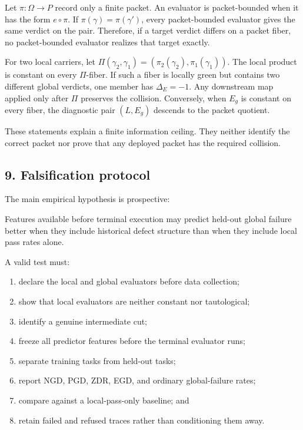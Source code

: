 \documentclass[
  11pt,
]{article}
\providecommand{\tightlist}{%
  \setlength{\itemsep}{0pt}\setlength{\parskip}{0pt}}
\theoremstyle{plain}
\theoremstyle{definition}\newtheorem{definition}[theorem]{Definition}
\theoremstyle{remark}\newtheorem*{remark}{Remark}
\renewenvironment{quote}{%
  \begin{mdframed}[linewidth=0pt,leftline=true,linecolor=obrule,
    rightline=false,topline=false,bottomline=false,
    innerleftmargin=1em,innerrightmargin=0.8em,innertopmargin=0.5em,
    innerbottommargin=0.5em,skipabove=0.6em,skipbelow=0.6em,
    backgroundcolor=obboxbg]\small}{\end{mdframed}}
\begin{document}
Let \(\pi:\Omega\to P\) record only a finite packet. An evaluator is
packet-bounded when it has the form \(e\circ\pi\). If
\(\pi(\gamma)=\pi(\gamma')\), every packet-bounded evaluator gives the same
verdict on the pair. Therefore, if a target verdict differs on a packet
fiber, no packet-bounded evaluator realizes that target exactly.

For two local carriers, let
\(\Pi(\gamma_2,\gamma_1)=(\pi_2(\gamma_2),\pi_1(\gamma_1))\).
The local product is constant on every \(\Pi\)-fiber. If such a fiber is
locally green but contains two different global verdicts, one member has
\(\Delta_E=-1\). Any downstream map applied only after \(\Pi\) preserves the
collision. Conversely, when \(E_g\) is constant on every fiber, the diagnostic
pair \((L,E_g)\) descends to the packet quotient.

These statements explain a finite information ceiling. They neither identify
the correct packet nor prove that any deployed packet has the required
collision.

\subsection{9. Falsification protocol}\label{falsification-protocol}

The main empirical hypothesis is prospective:

\begin{quote}
Features available before terminal execution may predict held-out global
failure better when they include historical defect structure than when they
include local pass rates alone.
\end{quote}

A valid test must:

\begin{enumerate}
\def\labelenumi{\arabic{enumi}.}
\tightlist
\item
  declare the local and global evaluators before data collection;
\item
  show that local evaluators are neither constant nor tautological;
\item
  identify a genuine intermediate cut;
\item
  freeze all predictor features before the terminal evaluator runs;
\item
  separate training tasks from held-out tasks;
\item
  report NGD, PGD, ZDR, EGD, and ordinary global-failure rates;
\item
  compare against a local-pass-only baseline; and
\item
  retain failed and refused traces rather than conditioning them away.
\end{enumerate}
\end{document}
